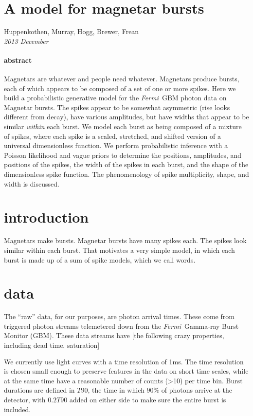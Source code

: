 \documentclass[12pt]{article}
\newcommand{\project}[1]{\textsl{#1}}
\newcommand{\Fermi}{\project{Fermi}}
\begin{document}
\section*{A model for magnetar bursts}

\noindent
Huppenkothen, Murray, Hogg, Brewer, Frean \\
\textsl{2013 December}

\paragraph{abstract}
Magnetars are whatever and people need whatever.
Magnetars produce bursts,
  each of which appears to be composed of a set of one or more spikes.
Here we build a probabilistic generative model for the \Fermi\ GBM photon data on Magnetar bursts.
The spikes appear to be somewhat asymmetric
  (rise looks different from decay),
  have various amplitudes,
  but have widths that appear to be similar \emph{within} each burst.
We model each burst as being composed of a mixture of spikes,
  where each spike is a scaled, stretched, and shifted version of a universal dimensionless function.
We perform probabilistic inference with a Poisson likelihood and vague priors to determine
  the positions, amplitudes, and positions of the spikes,
  the width of the spikes in each burst,
  and the shape of the dimensionless spike function.
The phenomenology of spike multiplicity, shape, and width is discussed.

\section{introduction}

Magnetars make bursts.
Magnetar bursts have many spikes each.
The spikes look similar within each burst.
That motivates a very simple model,
  in which each burst is made up of a sum of spike models, which we call words.

\section{data}

The ``raw'' data, for our purposes, are photon arrival times.
These come from triggered photon streams telemetered down from the \Fermi\ Gamma-ray Burst Monitor (GBM).
These data streams have [the following crazy properties, including dead time, saturation]

We currently use light curves with a time resolution of 1ms. The time resolution is chosen small enough to preserve features
in the data on short time scales, while at the same time have a reasonable number of counts (>10) per time bin. 
Burst durations are defined in $T90$, the time in which $90\%$ of photons arrive at the detector, with $0.2T90$ added on either side
to make sure the entire burst is included. 
\end{document}
